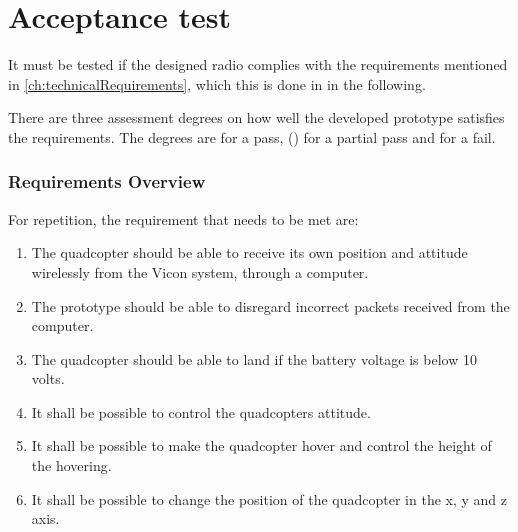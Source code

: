 \chapter{Acceptance test}

It must be tested if the designed radio complies with the requirements mentioned in \autoref{ch:technicalRequirements}, which this is done in in the following. %

There are three assessment degrees on how well the developed prototype satisfies the requirements. The degrees are  for a pass, () for a partial pass and  for a fail. 

\subsection*{Requirements Overview}
For repetition, the requirement that needs to be met are:
\begin{enumerate}[label=\textbf{\arabic*})]
\item {The quadcopter should be able to receive its own position and attitude wirelessly from the Vicon system, through a computer.}
\item {The prototype should be able to disregard incorrect packets received from the computer.}
\item {The quadcopter should be able to land if the battery voltage is below 10 volts.}
\item {It shall be possible to control the quadcopters attitude.}
\item {It shall be possible to make the quadcopter hover and control the height of the hovering.}
\item {It shall be possible to change the position of the quadcopter in the x, y and z axis.}
\end{enumerate}

\newpage

